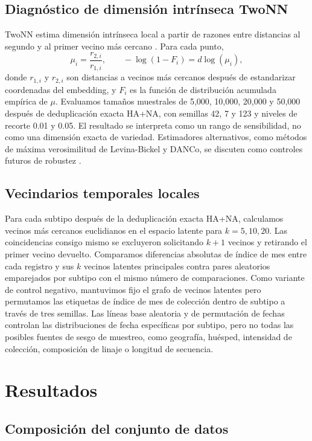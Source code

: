 \documentclass[11pt]{article}
\begin{document}
\subsection{Diagnóstico de dimensión intrínseca TwoNN}

TwoNN estima dimensión intrínseca local a partir de razones entre distancias al segundo y al primer vecino más cercano \cite{facco2017intrinsic}. Para cada punto,
\[
\mu_i=\frac{r_{2,i}}{r_{1,i}},
\qquad
-\log(1-F_i)=d\log(\mu_i),
\]
donde $r_{1,i}$ y $r_{2,i}$ son distancias a vecinos más cercanos después de estandarizar coordenadas del embedding, y $F_i$ es la función de distribución acumulada empírica de $\mu$. Evaluamos tamaños muestrales de 5,000, 10,000, 20,000 y 50,000 después de deduplicación exacta HA+NA, con semillas 42, 7 y 123 y niveles de recorte 0.01 y 0.05. El resultado se interpreta como un rango de sensibilidad, no como una dimensión exacta de variedad. Estimadores alternativos, como métodos de máxima verosimilitud de Levina-Bickel y DANCo, se discuten como controles futuros de robustez \cite{levina2005maximum,ceruti2014danco}.

\subsection{Vecindarios temporales locales}

Para cada subtipo después de la deduplicación exacta HA+NA, calculamos vecinos más cercanos euclidianos en el espacio latente para $k=5,10,20$. Las coincidencias consigo mismo se excluyeron solicitando $k+1$ vecinos y retirando el primer vecino devuelto. Comparamos diferencias absolutas de índice de mes entre cada registro y sus $k$ vecinos latentes principales contra pares aleatorios emparejados por subtipo con el mismo número de comparaciones. Como variante de control negativo, mantuvimos fijo el grafo de vecinos latentes pero permutamos las etiquetas de índice de mes de colección dentro de subtipo a través de tres semillas. Las líneas base aleatoria y de permutación de fechas controlan las distribuciones de fecha específicas por subtipo, pero no todas las posibles fuentes de sesgo de muestreo, como geografía, huésped, intensidad de colección, composición de linaje o longitud de secuencia.

\section{Resultados}

\subsection{Composición del conjunto de datos}
\end{document}
